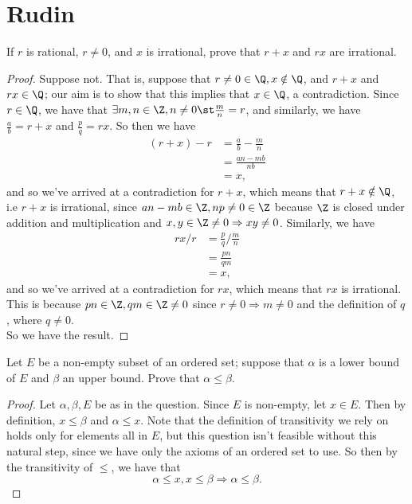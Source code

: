 \documentclass{assignment}
\begin{document}

\section*{Rudin}
\begin{question}[1]
  If $r$ is rational, $r\neq 0$, and $x$ is irrational, prove that $r+x$ and $rx$ are irrational.
\end{question}
\begin{proof}
  Suppose not. That is, suppose that $r\neq 0\in\Q, x\notin\Q$, and $r+x$ and $rx\in\Q$; our aim is to
  show that this implies that $x\in\Q$, a contradiction. Since $r\in\Q$, we have that $\exists m,n
  \in\Z, n\neq 0 \st \frac{m}{n} = r$, and similarly, we have $\frac{a}{b} = r + x$ and $\frac{p}{q}
  = rx$. So then we have 
  \begin{align*}
    (r + x) - r &= \frac{a}{b} - \frac{m}{n} \\
                &= \frac{an - mb}{nb} \\
                &= x, 
  \end{align*}
  and so we've arrived at a contradiction for $r+x$, which means that $r+x\notin\Q$, i.e $r+x$ is irrational,
  since $an-mb \in \Z, np\neq 0\in\Z$ because $\Z$ is closed under addition and multiplication and 
  $x,y\in\Z \neq 0 \Rightarrow xy\neq 0$. Similarly, we have
  \begin{align*}
    rx / r &= \frac{p}{q} / \frac{m}{n} \\
           &= \frac{pn}{qm} \\
           &= x,
  \end{align*}
  and so we've arrived at a contradiction for $rx$, which means that $rx$ is irrational. This is because
  $pn\in\Z, qm\in\Z\neq 0$ since $r\neq 0 \Rightarrow m\neq 0$ and the definition of $q$, where $q\neq 0$.\\

  So we have the result.
\end{proof}

\begin{question}[4]
  Let $E$ be a non-empty subset of an ordered set; suppose that $\alpha$ is a lower bound of $E$ and
$\beta$ an upper bound. Prove that $\alpha\leq\beta$.
\end{question}
\begin{proof}
  Let $\alpha, \beta, E$ be as in the question. Since $E$ is non-empty, let $x\in E$. Then by definition,
  $x\leq\beta$ and $\alpha\leq x$. Note that the definition of transitivity we rely on holds only for
  elements all in $E$, but this question isn't feasible without this natural step, since we have only 
  the axioms of an ordered set to use. So then by the transitivity of $\leq$, we have that 
  $$\alpha\leq x, x\leq\beta \Rightarrow \alpha\leq\beta.$$
\end{proof}
\end{document}
